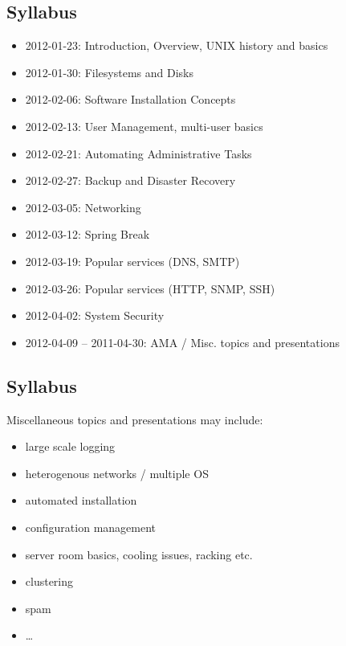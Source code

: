 \documentclass[xga]{xdvislides}
\begin{document}
\subsection{Syllabus}
\begin{itemize}
	\item 2012-01-23: Introduction, Overview, UNIX history and basics
	\item 2012-01-30: Filesystems and Disks
	\item 2012-02-06: Software Installation Concepts
	\item 2012-02-13: User Management, multi-user basics
	\item 2012-02-21: Automating Administrative Tasks
	\item 2012-02-27: Backup and Disaster Recovery
	\item 2012-03-05: Networking
	\item 2012-03-12: Spring Break
	\item 2012-03-19: Popular services (DNS, SMTP)
	\item 2012-03-26: Popular services (HTTP, SNMP, SSH)
	\item 2012-04-02: System Security
	\item 2012-04-09 -- 2011-04-30: AMA / Misc. topics and presentations
\end{itemize}

\subsection{Syllabus}
Miscellaneous topics and presentations may include:
\begin{itemize}
	\item large scale logging
	\item heterogenous networks / multiple OS
	\item automated installation
	\item configuration management
	\item server room basics, cooling issues, racking etc.
	\item clustering
	\item spam
	\item \ldots
\end{itemize}
\end{document}
